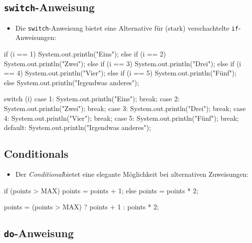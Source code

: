 \documentclass[a4paper,10pt, dvipsnames]{report}
\newcommand{\javaInLine}[1]{\texttt{#1}}
\begin{document}
\subsection{\texttt{switch}-Anweisung}

\begin{itemize}
    \item Die \javaInLine{switch}-Anweisung bietet eine Alternative für (stark) verschachtelte \javaInLine{if}-Anweisungen:
\end{itemize}

\begin{javacodebox}
if (i == 1)
    System.out.println("Eins");
else
    if (i == 2)
        System.out.println("Zwei");
    else
        if (i == 3)
            System.out.println("Drei");
        else
            if (i == 4)
                System.out.println("Vier");
            else
                if (i == 5)
                    System.out.println("Fünf");
                 else
                         System.out.println("Irgendwas anderes");
\end{javacodebox}

\begin{javacodebox}
switch (i) {
    case 1: System.out.println("Eins"); break;
    case 2: System.out.println("Zwei"); break;
    case 3: System.out.println("Drei"); break;
    case 4: System.out.println("Vier"); break;
    case 5: System.out.println("Fünf"); break;
    default: System.out.println("Irgendwas anderes");
}
\end{javacodebox}

\subsection{Conditionals}

\begin{itemize}
    \item Der \textit{Conditional}bietet eine elegante Möglichkeit bei alternativen Zuweisungen:
\end{itemize}

\begin{javacodebox}
if (points > MAX)
    points = points + 1;
else
    points = points * 2;
\end{javacodebox}

\begin{javacodebox}
points = (points > MAX) ? points + 1 : points * 2;
\end{javacodebox}

\subsection{\texttt{do}-Anweisung}
\end{document}
